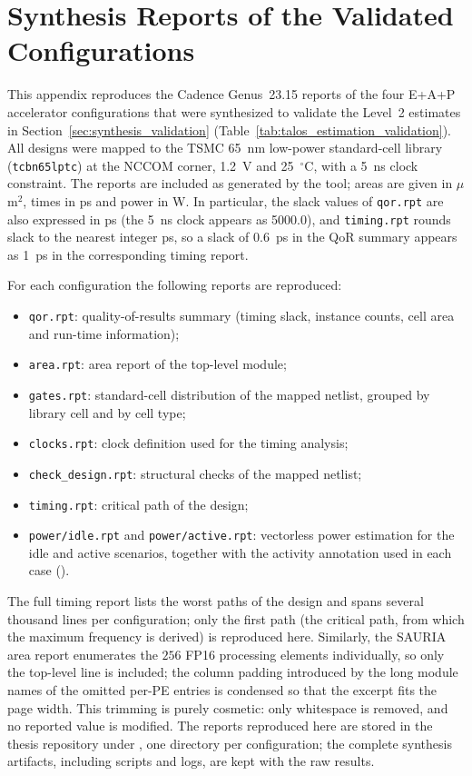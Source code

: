 \newpage
\section{Synthesis Reports of the Validated Configurations}
\label{app:synthesis_reports}

This appendix reproduces the Cadence Genus~23.15 reports of the four
E+A+P accelerator configurations that were synthesized to validate the
Level~2 estimates in
Section~\ref{sec:synthesis_validation}
(Table~\ref{tab:talos_estimation_validation}). All designs were mapped
to the TSMC 65~nm low-power standard-cell library
(\texttt{tcbn65lptc}) at the NCCOM corner, 1.2~V and 25~$^\circ$C,
with a 5~ns clock constraint. The reports are included as generated by
the tool; areas are given in $\mu$m$^2$, times in ps and power in W.
In particular, the slack values of \texttt{qor.rpt} are also expressed
in ps (the 5~ns clock appears as 5000.0), and \texttt{timing.rpt}
rounds slack to the nearest integer ps, so a slack of 0.6~ps in the
QoR summary appears as 1~ps in the corresponding timing report.

For each configuration the following reports are reproduced:

\begin{itemize}
    \item \texttt{qor.rpt}: quality-of-results summary (timing slack,
    instance counts, cell area and run-time information);
    \item \texttt{area.rpt}: area report of the top-level module;
    \item \texttt{gates.rpt}: standard-cell distribution of the mapped
    netlist, grouped by library cell and by cell type;
    \item \texttt{clocks.rpt}: clock definition used for the timing
    analysis;
    \item \texttt{check\_design.rpt}: structural checks of the mapped
    netlist;
    \item \texttt{timing.rpt}: critical path of the design;
    \item \texttt{power/idle.rpt} and \texttt{power/active.rpt}: vectorless
    power estimation for the idle and active scenarios, together with the
    activity annotation used in each case
    ().
\end{itemize}

The full timing report lists the worst paths of the design and spans
several thousand lines per configuration; only the first path (the
critical path, from which the maximum frequency is derived) is
reproduced here. Similarly, the SAURIA area report enumerates the
$256$ FP16 processing elements individually, so only the top-level
line is included; the column padding introduced by the long module
names of the omitted per-PE entries is condensed so that the excerpt
fits the page width. This trimming is purely cosmetic: only
whitespace is removed, and no reported value is modified. The
reports reproduced here are stored in the thesis repository under
, one directory per configuration; the
complete synthesis artifacts, including scripts and logs, are kept
with the raw results.

